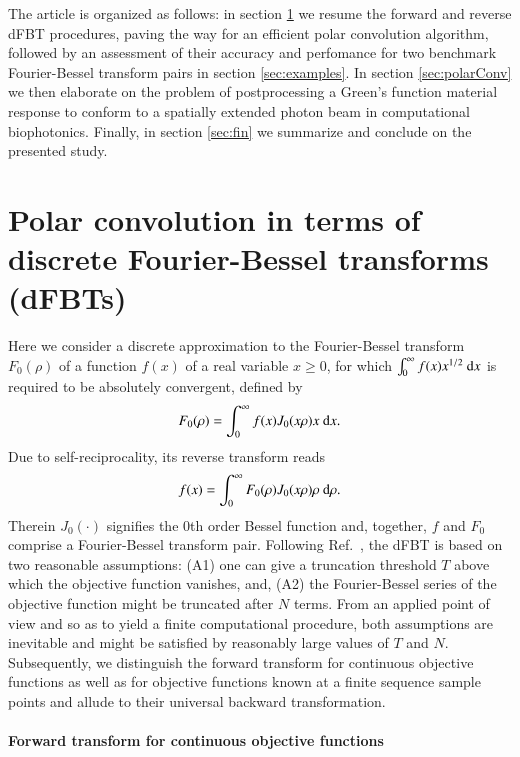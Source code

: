 \documentclass[review]{elsarticle}
\begin{document}
The article is organized as follows: in section \ref{sec:dFBT} we resume the
forward and reverse dFBT procedures, paving the way for an efficient polar
convolution algorithm, followed by an assessment of their accuracy and
perfomance for two benchmark Fourier-Bessel transform pairs in section
\ref{sec:examples}. In section \ref{sec:polarConv} we then elaborate on the
problem of postprocessing a Green's function material response to conform to a
spatially extended photon beam in computational biophotonics.  Finally, in
section \ref{sec:fin} we summarize and conclude on the presented study.

\section{Polar convolution in terms of discrete Fourier-Bessel transforms (dFBTs)}
\label{sec:dFBT}

Here we consider a discrete approximation to the Fourier-Bessel transform
$F_0(\rho)$ of a function $f(x)$ of a real variable $x\geq 0$, for which 
$\int_0^\infty f(x) x^{1/2}~{\rm d}x$ is required to be absolutely 
convergent, defined by 
\cite{Baddour:2009,Baddour:2015} 
\begin{equation}
F_0(\rho) = \int_0^\infty f(x) J_0(x\rho) x~{\rm{d}}x. \label{eq:FWD}
\end{equation}
Due to self-reciprocality, its reverse transform reads
\begin{equation}
f(x) = \int_0^\infty F_0(\rho) J_0(x\rho) \rho~{\rm{d}}\rho. \label{eq:BCKWD}
\end{equation}
Therein $J_0(\cdot)$ signifies the $0$th order Bessel function and, together,
$f$ and $F_0$ comprise a Fourier-Bessel transform pair.  Following
Ref.~\cite{FiskJohnson:1987}, the dFBT is based on two reasonable assumptions:
(A1) one can give a truncation threshold $T$ above which the objective function
vanishes, and, (A2) the Fourier-Bessel series of the objective function might
be truncated after $N$ terms.  From an applied point of view and so as to
yield a finite computational procedure, both assumptions are inevitable
and might be satisfied by reasonably large values of $T$ and $N$.
Subsequently, we distinguish the forward transform for continuous objective
functions as well as for objective functions known at a finite sequence sample
points and allude to their universal backward transformation.

\paragraph{Forward transform for continuous objective functions}
\end{document}
